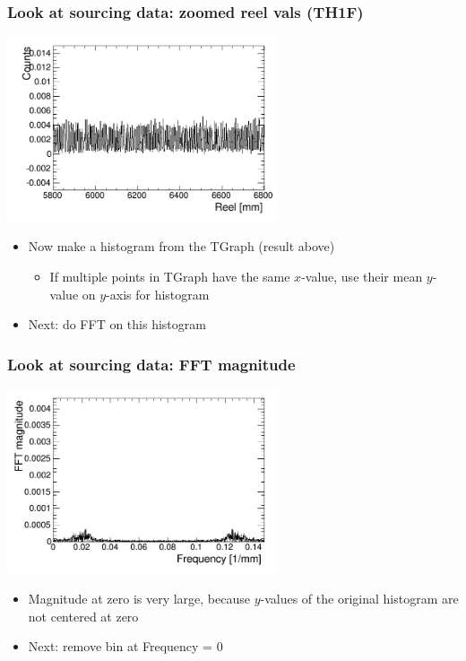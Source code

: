 \documentclass[bigger]{beamer}
\begin{document}
\begin{frame}
\frametitle{Look at sourcing data: zoomed reel vals (TH1F)}
\label{sec-3-1-5}
\label{sec-3-1-5-1}

\centering
\includegraphics[width=0.6\textwidth]{fig/original_histogram.png}
\begin{itemize}

\item Now make a histogram from the TGraph (result above)
\label{sec-3-1-5-2}%
\begin{itemize}

\item If multiple points in TGraph have the same $x$-value, use their mean $y$-value on $y$-axis for histogram
\label{sec-3-1-5-2-1}%
\end{itemize} %

\item Next: do FFT on this histogram
\label{sec-3-1-5-3}%
\end{itemize} %
\end{frame}
\begin{frame}
\frametitle{Look at sourcing data: FFT magnitude}
\label{sec-3-1-6}
\label{sec-3-1-6-1}

\centering
\includegraphics[width=0.6\textwidth]{fig/FFT_magnitude.png}
\begin{itemize}

\item Magnitude at zero is very large, because $y$-values of the original histogram are not centered at zero
\label{sec-3-1-6-2}%

\item Next: remove bin at Frequency = 0
\label{sec-3-1-6-3}%
\end{itemize} %
\end{frame}
\end{document}
